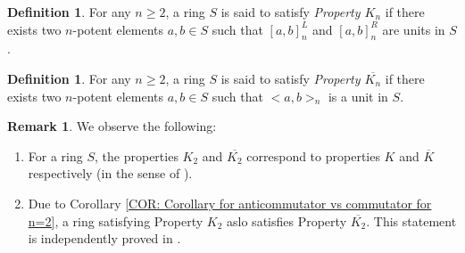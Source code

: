 \documentclass[12pt]{amsart}
\theoremstyle{definition}
\newtheorem{definition}[theorem]{Definition}
\newtheorem{remark}[theorem]{Remark}
\numberwithin{equation}{section}
\begin{document}
\begin{definition}\label{DEF: Property Kn}
  For any $n \geq 2$, a ring $S$ is said to satisfy \textit{Property $K_n$} if there exists two $n$-potent elements $a,b \in S$ such that $[a,b]_n^L$ and $[a,b]_n^R$ are units in $S$.  
\end{definition}
\begin{definition}\label{DEF: Property Kn bar}
  For any $n \geq 2$, a ring $S$ is said to satisfy \textit{Property $\overline{K_n}$} if there exists two $n$-potent elements $a,b \in S$ such that $<a,b>_n$ is a  unit in $S$.  
\end{definition}

\begin{remark}\label{REM: K_n and K_n bar}
We observe the following:
\begin{enumerate}
    \item For a ring $S$, the properties $K_2$ and $\overline{K_2}$ correspond to properties $K$ and $\overline{K}$ respectively (in the sense of \cite{khurana2018idempotents}).
    \item Due to Corollary \ref{COR: Corollary for anticommutator vs commutator for n=2}, a ring satisfying Property $K_2$ aslo satisfies Property $\overline{K_2}$. This statement is independently proved in \cite[Theorem A]{khurana2018idempotents}. 
\end{enumerate}
\end{remark}

\end{document}
